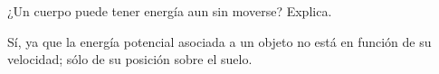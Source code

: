 ¿Un cuerpo puede tener energía aun sin moverse? Explica.


\begin{solutionbox}{2cm}
    Sí, ya que la energía potencial asociada a un objeto no está en función de su
    velocidad; sólo de su posición sobre el suelo.
\end{solutionbox}
